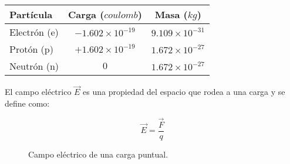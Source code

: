 \begin{center}
    \begin{tabular}{ l c c }
        \hline
        \rowcolor{blue!10}
        Partícula       & Carga (\( \si{coulomb} \))      & Masa (\( \si{kg} \))          \\ \hline
        Electrón (e)    & \( -1.602 \times 10^{-19} \)    & \( 9.109 \times 10^{-31} \)   \\
        Protón (p)      & \( +1.602 \times 10^{-19} \)    & \( 1.672 \times 10^{-27} \)   \\
        Neutrón (n)     & \( 0 \)                         & \( 1.672 \times 10^{-27} \)   \\ \hline
    \end{tabular}
\end{center}



El campo eléctrico \( \vec{E} \) es una propiedad del espacio que rodea a una carga y se define como:

\begin{equation}
    \vec{E} = \frac{\vec{F}}{q}
\end{equation}

\begin{figure}[ht]
    \centering
    \caption{Campo eléctrico de una carga puntual.}
    \label{fig:campo_electrico}
\end{figure}


% 
% 